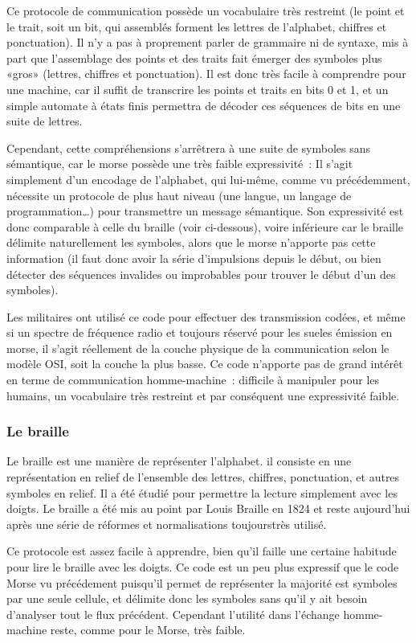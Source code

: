 \documentclass[french,a4paper]{article}
\begin{document}
Ce protocole de communication possède un vocabulaire très restreint (le point et le trait, soit un bit, qui assemblés forment les lettres de
l'alphabet, chiffres et ponctuation). Il n'y a pas à proprement parler de grammaire ni de syntaxe, mis à part que l'assemblage des points et
des traits fait émerger des symboles plus «gros» (lettres, chiffres et ponctuation). Il est donc très facile à comprendre pour une machine,
car il suffit de transcrire les points et traits en bits 0 et 1, et un simple automate à états finis permettra de décoder ces séquences de
bits en une suite de lettres.

Cependant, cette compréhensions s'arrêtrera à une suite de symboles sans sémantique, car le morse possède une très faible expressivité~: Il
s'agit simplement d'un encodage de l'alphabet, qui lui-même, comme vu précédemment, nécessite un protocole de plus haut niveau (une langue,
un langage de programmation…) pour transmettre un message sémantique. Son expressivité est donc comparable à celle du braille (voir
ci-dessous), voire inférieure car le braille délimite naturellement les symboles, alors que le morse n'apporte pas cette information (il
faut donc avoir la série d'impulsions depuis le début, ou bien détecter des séquences invalides ou improbables pour trouver le début d'un
des symboles).

Les militaires ont utilisé ce code pour effectuer des transmission codées, et même si un spectre de fréquence radio et toujours réservé pour
les sueles émission en morse, il s'agit réellement de la couche physique de la communication selon le modèle OSI, soit la couche la plus
basse. Ce code n'apporte pas de grand intérêt en terme de communication homme-machine~: difficile à manipuler pour les humains, un
vocabulaire très restreint et par conséquent une expressivité faible.

\subsubsection{Le braille}
Le braille est une manière de représenter l'alphabet. il consiste en une représentation en relief de l'ensemble des lettres, chiffres,
ponctuation, et autres symboles en relief. Il a été étudié pour permettre la lecture simplement avec les doigts. Le braille a été mis au
point par Louis Braille en 1824 et reste aujourd'hui après une série de réformes et normalisations toujourstrès utilisé.

Ce protocole est assez facile à apprendre, bien qu'il faille une certaine habitude pour lire le braille avec les doigts. Ce code est un peu
plus expressif que le code Morse vu précédement puisqu'il permet de représenter la majorité est symboles par une seule cellule, et délimite
donc les symboles sans qu'il y ait besoin d'analyser tout le flux précédent. Cependant l'utilité dans l'échange homme-machine reste, comme
pour le Morse, très faible.
\end{document}
